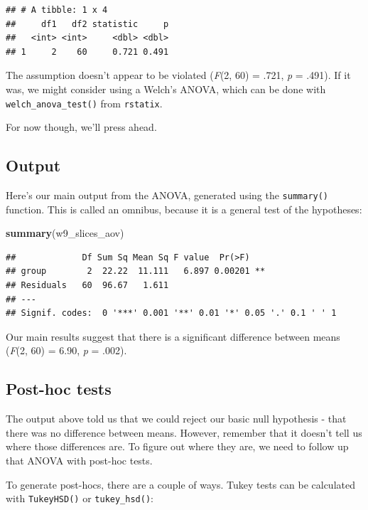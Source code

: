 \documentclass[
]{book}
\newenvironment{Shaded}{\begin{snugshade}}{\end{snugshade}}
\newcommand{\FunctionTok}[1]{\textcolor[rgb]{0.13,0.29,0.53}{\textbf{#1}}}
\newcommand{\NormalTok}[1]{#1}
\begin{document}
\begin{verbatim}
## # A tibble: 1 x 4
##     df1   df2 statistic     p
##   <int> <int>     <dbl> <dbl>
## 1     2    60     0.721 0.491
\end{verbatim}

The assumption doesn't appear to be violated (\emph{F}(2, 60) = .721, \emph{p} = .491). If it was, we
might consider using a Welch's ANOVA, which can be done with \texttt{welch\_anova\_test()} from \texttt{rstatix}.

For now though, we'll press ahead.

\hypertarget{output-5}{%
\subsection{Output}\label{output-5}}

Here's our main output from the ANOVA, generated using the \texttt{summary()} function. This is called an omnibus, because it is a general test of the hypotheses:

\begin{Shaded}
\begin{Highlighting}[]
\FunctionTok{summary}\NormalTok{(w9\_slices\_aov)}
\end{Highlighting}
\end{Shaded}

\begin{verbatim}
##             Df Sum Sq Mean Sq F value  Pr(>F)   
## group        2  22.22  11.111   6.897 0.00201 **
## Residuals   60  96.67   1.611                   
## ---
## Signif. codes:  0 '***' 0.001 '**' 0.01 '*' 0.05 '.' 0.1 ' ' 1
\end{verbatim}

Our main results suggest that there is a significant difference between means (\emph{F}(2, 60) = 6.90, \emph{p} = .002).

\hypertarget{post-hoc-tests-1}{%
\subsection{Post-hoc tests}\label{post-hoc-tests-1}}

The output above told us that we could reject our basic null hypothesis - that there was no difference between means. However, remember that it doesn't tell us where those differences are. To figure out where they are, we need to follow up that ANOVA with post-hoc tests.

To generate post-hocs, there are a couple of ways. Tukey tests can be calculated with \texttt{TukeyHSD()} or \texttt{tukey\_hsd()}:
\end{document}
